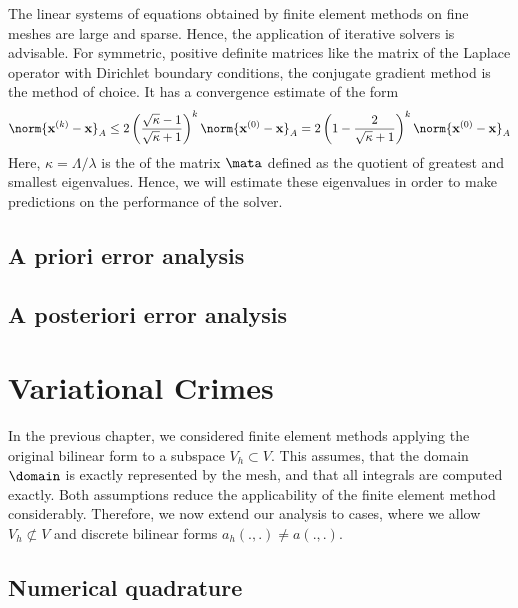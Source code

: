 \begin{intro}
  The linear systems of equations obtained by finite element methods
  on fine meshes are large and sparse. Hence, the application of
  iterative solvers is advisable. For symmetric, positive definite
  matrices like the matrix of the Laplace operator with Dirichlet
  boundary conditions, the conjugate gradient method is the method of
  choice. It has a convergence estimate of the form
  \begin{gather}
    \label{eq:cg:1}
    \norm{\vecx^{(k)} - \vecx}_A \le 2
    \left(\frac{\sqrt\kappa-1}{\sqrt\kappa+1}\right)^k \norm{\vecx^{(0)} - \vecx}_A
    =
    2\left(1-\frac{2}{\sqrt\kappa+1}\right)^k \norm{\vecx^{(0)} - \vecx}_A
  \end{gather}
  Here, $\kappa = \Lambda/\lambda$ is the  of the matrix $\mata$ defined as the quotient of greatest
  and smallest eigenvalues. Hence, we will estimate these eigenvalues
  in order to make predictions on the performance of the solver.
\end{intro}






\section{A priori error analysis}

\section{A posteriori error analysis}


\chapter{Variational Crimes}
\begin{intro}
  In the previous chapter, we considered finite element methods
  applying the original bilinear form to a subspace $V_h\subset
  V$. This assumes, that the domain $\domain$ is exactly represented
  by the mesh, and that all integrals are computed exactly. Both
  assumptions reduce the applicability of the finite element method
  considerably. Therefore, we now extend our analysis to cases, where
  we allow $V_h \not\subset V$ and discrete bilinear forms
  $a_h(.,.) \neq a(.,.)$.
\end{intro}

\section{Numerical quadrature}


